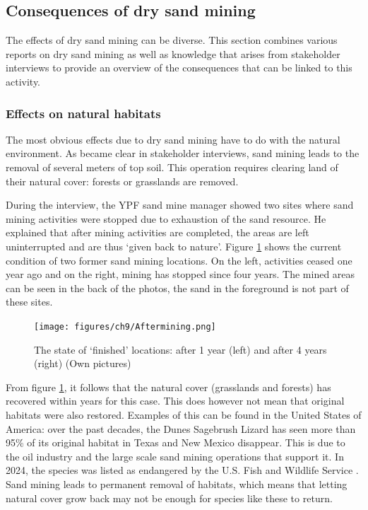 \subsection{Consequences of dry sand mining}
\label{sect:dryminingeffects}
The effects of dry sand mining can be diverse. This section combines various reports on dry sand mining as well as knowledge that arises from stakeholder interviews to provide an overview of the consequences that can be linked to this activity.

\subsubsection{Effects on natural habitats}
The most obvious effects due to dry sand mining have to do with the natural environment. As became clear in stakeholder interviews, sand mining leads to the removal of several meters of top soil. This operation requires clearing land of their natural cover: forests or grasslands are removed.

During the interview, the YPF sand mine manager showed two sites where sand mining activities were stopped due to exhaustion of the sand resource. He explained that after mining activities are completed, the areas are left uninterrupted and are thus `given back to nature'. Figure \ref{fig:aftermining} shows the current condition of two former sand mining locations. On the left, activities ceased one year ago and on the right, mining has stopped since four years. The mined areas can be seen in the back of the photos, the sand in the foreground is not part of these sites.

\begin{figure}[H]
    \centering
    \texttt{[image: figures/ch9/Aftermining.png]}
    \caption{The state of `finished' locations: after 1 year (left) and after 4 years (right) (Own pictures)}
    \label{fig:aftermining}
\end{figure}

From figure \ref{fig:aftermining}, it follows that the natural cover (grasslands and forests) has recovered within years for this case. This does however not mean that original habitats were also restored. Examples of this can be found in the United States of America: over the past decades, the Dunes Sagebrush Lizard has seen more than 95\% of its original habitat in Texas and New Mexico disappear. This is due to the oil industry and the large scale sand mining operations that support it. In 2024, the species was listed as endangered by the U.S. Fish and Wildlife Service \autocite{centerforbiologicaldiversityLegalInterventionLaunched2025}. Sand mining leads to permanent removal of habitats, which means that letting natural cover grow back may not be enough for species like these to return.

